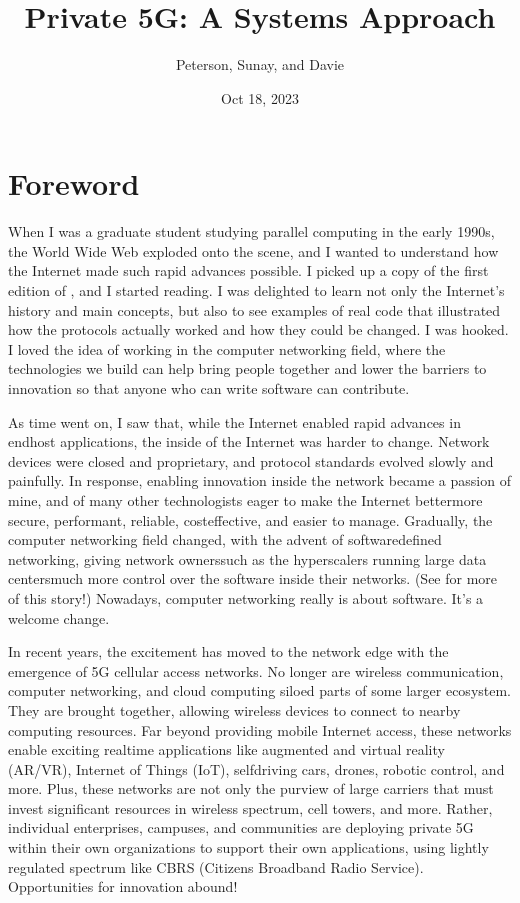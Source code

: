 \documentclass[a4paper,11pt,english]{sphinxmanual}
\title{Private 5G: A Systems Approach}
\date{Oct 18, 2023}
\author{Peterson, Sunay, and Davie }
\begin{document}
\pagestyle{empty}
\sphinxmaketitle
\pagestyle{plain}
\sphinxtableofcontents
\pagestyle{normal}
\label{\detokenize{index::doc}}



\chapter*{Foreword}
\label{\detokenize{foreword:foreword}}\label{\detokenize{foreword::doc}}
\sphinxAtStartPar
When I was a graduate student studying parallel computing in the early
1990s, the World Wide Web exploded onto the scene, and I wanted to
understand how the Internet made such rapid advances possible. I
picked up a copy of the first edition of , and I started reading. I was delighted to learn not only
the Internet’s history and main concepts, but also to see examples of
real code that illustrated how the protocols actually worked and how
they could be changed. I was hooked. I loved the idea of working in
the computer networking field, where the technologies we build can
help bring people together and lower the barriers to innovation so
that anyone who can write software can contribute.

\sphinxAtStartPar
As time went on, I saw that, while the Internet enabled rapid advances
in end\sphinxhyphen{}host applications, the inside of the Internet was harder to
change. Network devices were closed and proprietary, and protocol
standards evolved slowly and painfully. In response, enabling
innovation inside the network became a passion of mine, and of many
other technologists eager to make the Internet better\textendash{}more secure,
performant, reliable, cost\sphinxhyphen{}effective, and easier to manage.
Gradually, the computer networking field changed, with the advent of
software\sphinxhyphen{}defined networking, giving network owners\textendash{}such as the
hyperscalers running large data centers\textendash{}much more control over the
software inside their networks. (See  for more of this story!) Nowadays, computer
networking really is about software. It’s a welcome change.

\sphinxAtStartPar
In recent years, the excitement has moved to the network edge with the
emergence of 5G cellular access networks. No longer are wireless
communication, computer networking, and cloud computing siloed parts
of some larger ecosystem. They are brought together, allowing wireless
devices to connect to nearby computing resources. Far beyond providing
mobile Internet access, these networks enable exciting real\sphinxhyphen{}time
applications like augmented and virtual reality (AR/VR), Internet of
Things (IoT), self\sphinxhyphen{}driving cars, drones, robotic control, and more.
Plus, these networks are not only the purview of large carriers that
must invest significant resources in wireless spectrum, cell towers,
and more. Rather, individual enterprises, campuses, and communities
are deploying private 5G within their own organizations to support
their own applications, using lightly regulated spectrum like CBRS
(Citizens Broadband Radio Service). Opportunities for innovation
abound!
\end{document}
